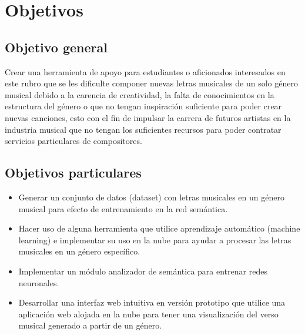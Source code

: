 \documentclass[12pt, a4paper, titlepage]{report}
\begin{document}
	\section{Objetivos}
	\subsection{Objetivo general}
	Crear una herramienta de apoyo para estudiantes o aficionados interesados en este rubro que se les dificulte componer nuevas letras musicales de un solo género musical debido a la carencia de creatividad, la falta de conocimientos en la estructura del género o que no tengan inspiración suficiente para poder crear nuevas canciones, esto con el fin de impulsar la carrera de futuros artistas en la industria musical que no tengan los suficientes recursos para poder contratar servicios particulares de compositores.
	
	\subsection{Objetivos particulares}
		\begin{itemize}
			\item Generar un conjunto de datos (dataset) con letras musicales en un género musical para efecto de entrenamiento en la red semántica.
    		\item Hacer uso de alguna herramienta que utilice aprendizaje automático (machine learning) e implementar su uso en la nube para ayudar a procesar las letras musicales en un género específico.
    		\item Implementar un módulo analizador de semántica para entrenar redes neuronales.
    		\item Desarrollar una interfaz web intuitiva en versión prototipo que utilice una aplicación web alojada en la nube para tener una visualización del verso musical generado a partir de un género.
    	\end{itemize}
		
\end{document}
